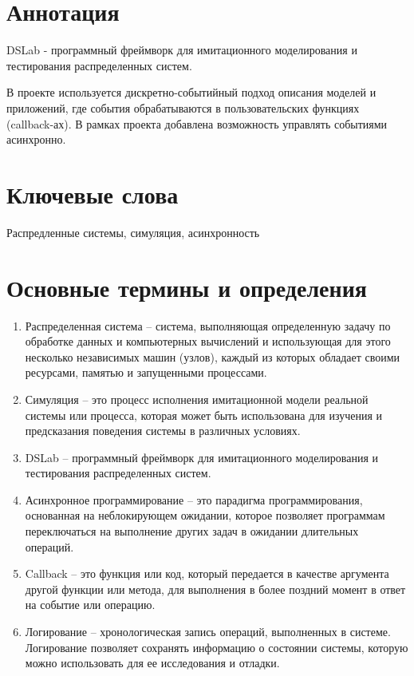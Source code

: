 
\section*{Аннотация}

DSLab - программный фреймворк для имитационного моделирования и тестирования распределенных систем.

В проекте используется дискретно-событийный подход описания моделей и приложений, где события обрабатываются в пользовательских функциях (callback-ах). В рамках проекта добавлена возможность управлять событиями асинхронно.

\section*{Ключевые слова}

Распредленные системы, симуляция, асинхронность 


\newpage 

\section{Основные термины и определения}

\begin{enumerate}
    \item Распределенная система -- система, выполняющая определенную задачу по обработке данных и компьютерных вычислений и использующая для этого несколько независимых машин (узлов), каждый из которых обладает своими ресурсами, памятью и запущенными процессами.
    \item Симуляция -- это процесс исполнения имитационной модели реальной системы или процесса, которая может быть использована для изучения и предсказания поведения системы в различных условиях.
    \item DSLab -- программный фреймворк для имитационного моделирования и тестирования распределенных систем.
    \item Асинхронное программирование -- это парадигма программирования, основанная на неблокирующем ожидании, которое позволяет программам переключаться на выполнение других задач в ожидании длительных операций.
    \item Callback -- это функция или код, который передается в качестве аргумента другой функции или метода, для выполнения в более поздний момент в ответ на событие или операцию.
    \item Логирование -- хронологическая запись операций, выполненных в системе. Логирование позволяет сохранять информацию о состоянии системы, которую можно использовать для ее исследования и отладки.
\end{enumerate}

